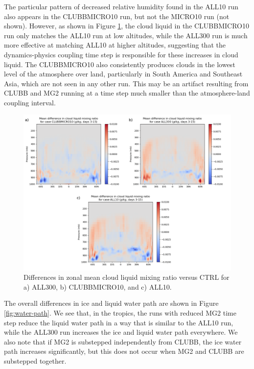 \documentclass [11pt, proquest] {uwthesis}[2020/02/24]
\begin{document}
The particular pattern of decreased relative humidity found in the ALL10 run also appears in the CLUBBMICRO10 run, but not the MICRO10 run (not shown). However, as shown in Figure \ref{fig:cldliq-map}, the cloud liquid in the CLUBBMICRO10 run only matches the ALL10 run at low altitudes, while the ALL300 run is much more effective at matching ALL10 at higher altitudes, suggesting that the dynamics-physics coupling time step is responsible for these increases in cloud liquid. The CLUBBMICRO10 also consistently produces clouds in the lowest level of the atmosphere over land, particularly in South America and Southeast Asia, which are not seen in any other run. This may be an artifact resulting from CLUBB and MG2 running at a time step much smaller than the atmosphere-land coupling interval.

\begin{figure}
    \centering
    \includegraphics[width=6.5in]{Figure9.png}
    \caption[Differences in zonal mean cloud liquid mixing ratio between short EAMv1 runs using different forms of substepping]{Differences in zonal mean cloud liquid mixing ratio versus CTRL for a) ALL300, b) CLUBBMICRO10, and c) ALL10.}
    \label{fig:cldliq-map}
\end{figure}

The overall differences in ice and liquid water path are shown in Figure \ref{fig:water-path}. We see that, in the tropics, the runs with reduced MG2 time step reduce the liquid water path in a way that is similar to the ALL10 run, while the ALL300 run increases the ice and liquid water path everywhere. We also note that if MG2 is substepped independently from CLUBB, the ice water path increases significantly, but this does not occur when MG2 and CLUBB are substepped together.
\end{document}
